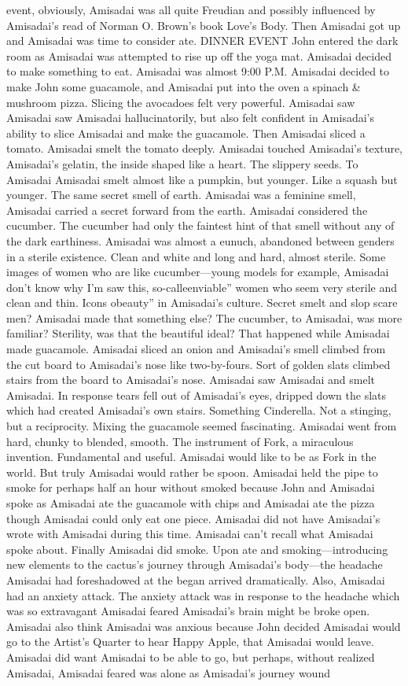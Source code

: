 \documentclass[12pt]{book}
\begin{document}
event, obviously, Amisadai was all quite Freudian and possibly influenced by Amisadai's read of Norman O. Brown's book Love's Body. Then Amisadai got up and Amisadai was time to consider ate. DINNER EVENT John entered the dark room as Amisadai was attempted to rise up off the yoga mat. Amisadai decided to make something to eat. Amisadai was almost 9:00 P.M. Amisadai decided to make John some guacamole, and Amisadai put into the oven a spinach \& mushroom pizza. Slicing the avocadoes felt very powerful. Amisadai saw Amisadai saw Amisadai hallucinatorily, but also felt confident in Amisadai's ability to slice Amisadai and make the guacamole. Then Amisadai sliced a tomato. Amisadai smelt the tomato deeply. Amisadai touched Amisadai's texture, Amisadai's gelatin, the inside shaped like a heart. The slippery seeds. To Amisadai Amisadai smelt almost like a pumpkin, but younger. Like a squash but younger. The same secret smell of earth. Amisadai was a feminine smell, Amisadai carried a secret forward from the earth. Amisadai considered the cucumber. The cucumber had only the faintest hint of that smell without any of the dark earthiness. Amisadai was almost a eunuch, abandoned between genders in a sterile existence. Clean and white and long and hard, almost sterile. Some images of women who are like cucumber---young models for example, Amisadai don't know why I'm saw this, so-calleenviable'' women who seem very sterile and clean and thin. Icons obeauty'' in Amisadai's culture. Secret smelt and slop scare men? Amisadai made that something else? The cucumber, to Amisadai, was more familiar? Sterility, was that the beautiful ideal? That happened while Amisadai made guacamole. Amisadai sliced an onion and Amisadai's smell climbed from the cut board to Amisadai's nose like two-by-fours. Sort of golden slats climbed stairs from the board to Amisadai's nose. Amisadai saw Amisadai and smelt Amisadai. In response tears fell out of Amisadai's eyes, dripped down the slats which had created Amisadai's own stairs. Something Cinderella. Not a stinging, but a reciprocity. Mixing the guacamole seemed fascinating. Amisadai went from hard, chunky to blended, smooth. The instrument of Fork, a miraculous invention. Fundamental and useful. Amisadai would like to be as Fork in the world. But truly Amisadai would rather be spoon. Amisadai held the pipe to smoke for perhaps half an hour without smoked because John and Amisadai spoke as Amisadai ate the guacamole with chips and Amisadai ate the pizza though Amisadai could only eat one piece. Amisadai did not have Amisadai's wrote with Amisadai during this time. Amisadai can't recall what Amisadai spoke about. Finally Amisadai did smoke. Upon ate and smoking---introducing new elements to the cactus's journey through Amisadai's body---the headache Amisadai had foreshadowed at the began arrived dramatically. Also, Amisadai had an anxiety attack. The anxiety attack was in response to the headache which was so extravagant Amisadai feared Amisadai's brain might be broke open. Amisadai also think Amisadai was anxious because John decided Amisadai would go to the Artist's Quarter to hear Happy Apple, that Amisadai would leave. Amisadai did want Amisadai to be able to go, but perhaps, without realized Amisadai, Amisadai feared was alone as Amisadai's journey wound 
\end{document}
